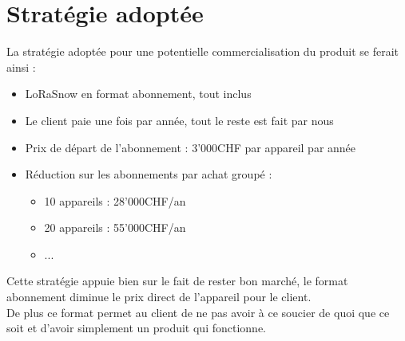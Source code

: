 \section{Stratégie adoptée}
La stratégie adoptée pour une potentielle commercialisation du produit se ferait ainsi :
\begin{itemize}
    \item LoRaSnow en format abonnement, tout inclus
    \item Le client paie une fois par année, tout le reste est fait par nous
    \item Prix de départ de l'abonnement : 3'000CHF par appareil par année
    \item Réduction sur les abonnements par achat groupé :
    \begin{itemize}
        \item 10 appareils : 28'000CHF/an
        \item 20 appareils : 55'000CHF/an
        \item ...
    \end{itemize}
\end{itemize}
\noindent
Cette stratégie appuie bien sur le fait de rester bon marché, le format abonnement
diminue le prix direct de l'appareil pour le client.\\
De plus ce format permet au client de ne pas avoir à ce soucier de quoi que ce soit et d'avoir
simplement un produit qui fonctionne.